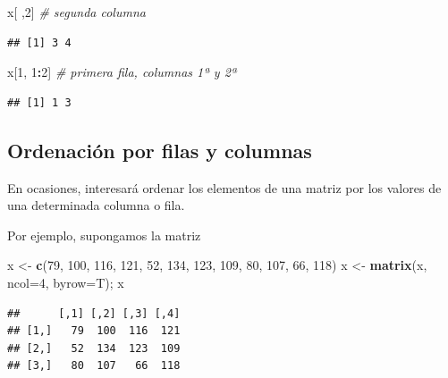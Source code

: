 \documentclass[]{book}
\newenvironment{Shaded}{\begin{snugshade}}{\end{snugshade}}
\newcommand{\KeywordTok}[1]{\textcolor[rgb]{0.13,0.29,0.53}{\textbf{#1}}}
\newcommand{\DataTypeTok}[1]{\textcolor[rgb]{0.13,0.29,0.53}{#1}}
\newcommand{\DecValTok}[1]{\textcolor[rgb]{0.00,0.00,0.81}{#1}}
\newcommand{\StringTok}[1]{\textcolor[rgb]{0.31,0.60,0.02}{#1}}
\newcommand{\CommentTok}[1]{\textcolor[rgb]{0.56,0.35,0.01}{\textit{#1}}}
\newcommand{\OperatorTok}[1]{\textcolor[rgb]{0.81,0.36,0.00}{\textbf{#1}}}
\newcommand{\NormalTok}[1]{#1}
\begin{document}
\begin{Shaded}
\begin{Highlighting}[]
\NormalTok{x[ ,}\DecValTok{2}\NormalTok{]  }\CommentTok{# segunda columna}
\end{Highlighting}
\end{Shaded}

\begin{verbatim}
## [1] 3 4
\end{verbatim}

\begin{Shaded}
\begin{Highlighting}[]
\NormalTok{x[}\DecValTok{1}\NormalTok{, }\DecValTok{1}\OperatorTok{:}\DecValTok{2}\NormalTok{]  }\CommentTok{# primera fila, columnas 1ª y 2ª }
\end{Highlighting}
\end{Shaded}

\begin{verbatim}
## [1] 1 3
\end{verbatim}

\subsection{Ordenación por filas y
columnas}\label{ordenacion-por-filas-y-columnas}

En ocasiones, interesará ordenar los elementos de una matriz por los
valores de una determinada columna o fila.

Por ejemplo, supongamos la matriz

\begin{Shaded}
\begin{Highlighting}[]
\NormalTok{x <-}\StringTok{ }\KeywordTok{c}\NormalTok{(}\DecValTok{79}\NormalTok{, }\DecValTok{100}\NormalTok{, }\DecValTok{116}\NormalTok{, }\DecValTok{121}\NormalTok{, }\DecValTok{52}\NormalTok{, }\DecValTok{134}\NormalTok{, }\DecValTok{123}\NormalTok{, }\DecValTok{109}\NormalTok{, }\DecValTok{80}\NormalTok{, }\DecValTok{107}\NormalTok{, }\DecValTok{66}\NormalTok{, }\DecValTok{118}\NormalTok{)}
\NormalTok{x <-}\StringTok{ }\KeywordTok{matrix}\NormalTok{(x, }\DataTypeTok{ncol=}\DecValTok{4}\NormalTok{, }\DataTypeTok{byrow=}\NormalTok{T); x}
\end{Highlighting}
\end{Shaded}

\begin{verbatim}
##      [,1] [,2] [,3] [,4]
## [1,]   79  100  116  121
## [2,]   52  134  123  109
## [3,]   80  107   66  118
\end{verbatim}
\end{document}
